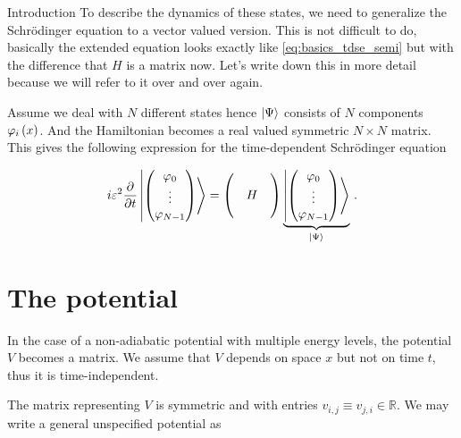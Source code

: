 \begin{chapter}{Introduction}
To describe the dynamics of these states, we need to generalize the Schrödinger equation
to a vector valued version. This is not difficult to do, basically the extended equation looks
exactly like \eqref{eq:basics_tdse_semi} but with the difference that $H$ is a matrix now.
Let's write down this in more detail because we will refer to it over and over again.

Assume we deal with $N$ different states hence $\Ket{\Psi}$ consists of $N$ components
$\varphi_i \left( x \right)$. And the Hamiltonian becomes a real valued symmetric $N \times N$
matrix. This gives the following expression for the time-dependent Schrödinger equation

\begin{equation} \label{eq:basics_tdse_vector}
  i \varepsilon^2 \frac{\partial}{\partial t} \Ket{ \begin{pmatrix}
                                                   \varphi_0 \\
                                                   \vdots \\
                                                   \varphi_{N-1}
                                                 \end{pmatrix}
                                               }
  =
  \begin{pmatrix}
    {} & {} & {} \\
    {} & H  & {} \\
    {} & {} & {} \\
  \end{pmatrix}
  \underbrace{
  \Ket{ \begin{pmatrix}
          \varphi_0 \\
          \vdots \\
          \varphi_{N-1}
        \end{pmatrix}
      }}_{\Ket{\Psi}} \,.
\end{equation}

\section{The potential}

In the case of a non-adiabatic potential with multiple energy levels,
the potential $V$ becomes a matrix. We assume that $V$ depends on space $x$
but not on time $t$, thus it is time-independent.

The matrix representing $V$ is symmetric and with entries $v_{i,j} \equiv v_{j,i} \in \mathbb{R}$. We may
write a general unspecified potential as


\end{chapter}

